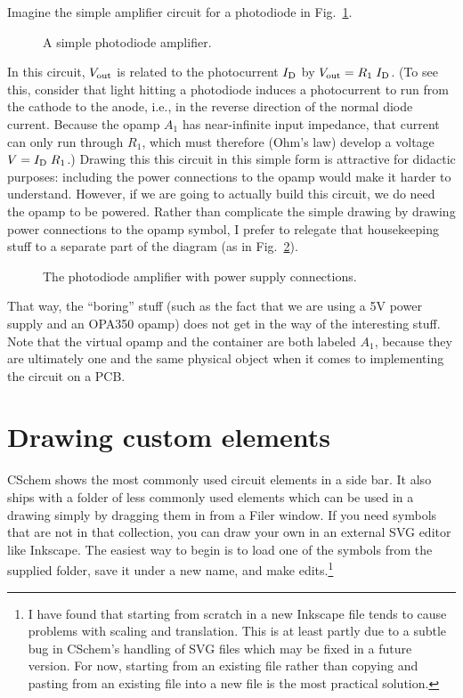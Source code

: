 \documentclass[11pt]{report}
\def\subfig#1#2{{\sf\small\bfseries#1}\raisebox{-.2in}{\raisebox{-.5\height}{\texttt{[image: \#2]}}}}
\def\sub#1{\textrm{\scriptsize#1}}
\begin{document}
Imagine the simple amplifier circuit for a photodiode in
Fig.~\ref{pdamp}.
%
\begin{figure}[h]
  \mbox{}\hfill\subfig{}{ug-pdamp}\hfill\mbox{}
  \caption{A simple photodiode amplifier.}\label{pdamp}
\end{figure}
%
In this circuit, $V_\textrm{\scriptsize out}$ is related to the
photocurrent $I_\sub{D}$ by $V_\sub{out} = R_1\;I_\sub{D}$. (To see
this, consider that light hitting a photodiode induces a photocurrent
to run from the cathode to the anode, i.e., in the reverse direction
of the normal diode current. Because the opamp $A_1$ has near-infinite
input impedance, that current can only run through $R_1$, which must
therefore (Ohm's law) develop a voltage $V = I_\sub{D}\;R_1$.) Drawing
this this circuit in this simple form is attractive for didactic
purposes: including the power connections to the opamp would make it
harder to understand. However, if we are going to actually build this
circuit, we do need the opamp to be powered. Rather than complicate
the simple drawing by drawing power connections to the opamp symbol, I
prefer to relegate that housekeeping stuff to a separate part of the
diagram (as in Fig.~\ref{pdampcont}).
%
\begin{figure}[h]
  \mbox{}\hfill\subfig{}{ug-pdamp-cont}\hfill\mbox{}
  \caption{The photodiode amplifier with power supply
    connections.}\label{pdampcont}
\end{figure}
%
That way, the ``boring'' stuff (such as the fact that we are using a
5V power supply and an OPA350 opamp) does not get in the way of the
interesting stuff. Note that the virtual opamp and the container are
both labeled $A_1$, because they are ultimately one and the same
physical object when it comes to implementing the circuit on a PCB.

\section{Drawing custom elements}\label{sec.custom}

CSchem shows the most commonly used circuit elements in a side bar. It
also ships with a folder of less commonly used elements which can be
used in a drawing simply by dragging them in from a Filer window. If
you need symbols that are not in that collection, you can draw your
own in an external SVG editor like Inkscape. The easiest way to begin
is to load one of the symbols from the supplied folder, save it under
a new name, and make edits.\footnote{I have found that starting from
  scratch in a new Inkscape file tends to cause problems with scaling
  and translation. This is at least partly due to a subtle bug in
  CSchem's handling of SVG files which may be fixed in a future
  version. For now, starting from an existing file rather than copying
  and pasting from an existing file into a new file is the most
  practical solution.}
\end{document}

